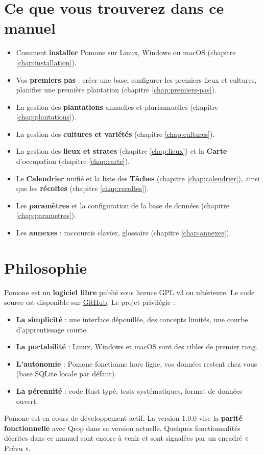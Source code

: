 \section{Ce que vous trouverez dans ce manuel}

\begin{itemize}
  \item Comment \textbf{installer} Pomone sur Linux, Windows ou macOS (chapitre \ref{chap:installation}).
  \item Vos \textbf{premiers pas} : créer une base, configurer les premiers lieux et cultures, planifier une première plantation (chapitre \ref{chap:premiers-pas}).
  \item La gestion des \textbf{plantations} annuelles et pluriannuelles (chapitre \ref{chap:plantations}).
  \item La gestion des \textbf{cultures et variétés} (chapitre \ref{chap:cultures}).
  \item La gestion des \textbf{lieux et strates} (chapitre \ref{chap:lieux}) et la \textbf{Carte} d'occupation (chapitre \ref{chap:carte}).
  \item Le \textbf{Calendrier} unifié et la liste des \textbf{Tâches} (chapitre \ref{chap:calendrier}), ainsi que les \textbf{récoltes} (chapitre \ref{chap:recoltes}).
  \item Les \textbf{paramètres} et la configuration de la base de données (chapitre \ref{chap:parametres}).
  \item Les \textbf{annexes} : raccourcis clavier, glossaire (chapitre \ref{chap:annexes}).
\end{itemize}

\section{Philosophie}

Pomone est un \textbf{logiciel libre} publié sous licence GPL v3 ou ultérieure. Le code source est disponible sur \href{https://github.com/guycorbaz/pomone}{GitHub}. Le projet privilégie :

\begin{itemize}
  \item \textbf{La simplicité} : une interface dépouillée, des concepts limités, une courbe d'apprentissage courte.
  \item \textbf{La portabilité} : Linux, Windows et macOS sont des cibles de premier rang.
  \item \textbf{L'autonomie} : Pomone fonctionne hors ligne, vos données restent chez vous (base SQLite locale par défaut).
  \item \textbf{La pérennité} : code Rust typé, tests systématiques, format de données ouvert.
\end{itemize}

\begin{notebox}
Pomone est en cours de développement actif. La version 1.0.0 vise la \textbf{parité fonctionnelle} avec Qrop dans sa version actuelle. Quelques fonctionnalités décrites dans ce manuel sont encore à venir et sont signalées par un encadré « Prévu ».
\end{notebox}
